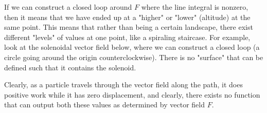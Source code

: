   If we can construct a closed loop around $F$ where the line integral is nonzero, then it means that we have ended up at a "higher" or "lower" (altitude) at the same point. This means that rather than being a certain landscape, there exist different "levels" of values at one point, like a spiraling staircase. For example, look at the solenoidal vector field below, where we can construct a closed loop (a circle going around the origin counterclockwise). There is no "surface" that can be defined such that it contains the solenoid. 

	\begin{figure}[H]
		\centering 
		\caption{} 
		\label{fig:solenoid_nonconservative}
	\end{figure}

  Clearly, as a particle travels through the vector field along the path, it does positive work while it has zero displacement, and clearly, there exists no function that can output both these values as determined by vector field $F$. 

